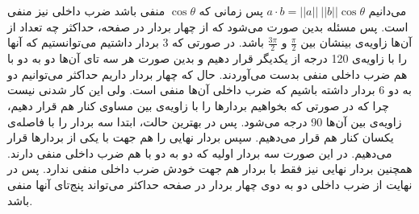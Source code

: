\\\\
می‌دانیم
$a \cdot b = ||a|| ~ ||b|| \cos \theta$
پس زمانی که
$\cos \theta$
منفی باشد ضرب داخلی نیز منفی است.
پس مسئله بدین صورت می‌شود که از چهار بردار در صفحه، حداکثر چه تعداد از آن‌ها زاویه‌ی بینشان بین
$\frac{\pi}{2}$
و
$\frac{3\pi}{2}$
باشد.
در صورتی که 3 بردار داشتیم می‌توانستیم که آنها را با زاویه‌ی 120 درجه از یکدیگر قرار دهیم و بدین صورت
هر سه تای آن‌ها دو به دو با هم ضرب داخلی منفی بدست می‌آوردند.
حال که چهار بردار داریم حداکثر می‌توانیم دو به دو 6 بردار داشته باشیم که ضرب داخلی آن‌ها منفی است.
ولی این کار شدنی نیست چرا که در صورتی که بخواهیم بردار‌ها را با زاویه‌ی بین مساوی کنار هم قرار دهیم،
زاویه‌ی بین آن‌ها 90 درجه می‌شود.
پس در بهترین حالت، ابتدا سه بردار را با فاصله‌ی یکسان کنار هم قرار می‌دهیم. سپس بردار نهایی را
هم جهت با یکی از بردار‌ها قرار می‌دهیم. در این صورت سه بردار اولیه که دو به دو با هم ضرب داخلی منفی‌ دارند.
همچنین بردار نهایی نیز فقط با بردار هم جهت خودش ضرب داخلی منفی ندارد.
پس در نهایت از ضرب داخلی دو به دوی چهار بردار در صفحه حداکثر می‌تواند پنج‌تای آنها منفی باشد.